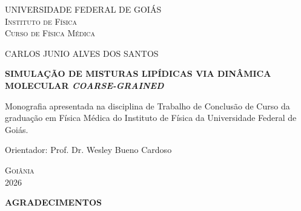 \newpage
\begin{center}
{\fontsize{12}{13.8}\selectfont
UNIVERSIDADE FEDERAL DE GOIÁS \\
\textsc{Instituto de Física} \\
\textsc{Curso de Física Médica}\par}

\vspace*{9\baselineskip}

{\fontsize{12}{13.8}\selectfont CARLOS JUNIO ALVES DOS SANTOS\par}

\vspace*{4\baselineskip}

{\fontsize{16}{18.4}\selectfont \textbf{SIMULAÇÃO DE MISTURAS LIPÍDICAS VIA DINÂMICA MOLECULAR \textit{COARSE-GRAINED}}\par}

\vspace*{\baselineskip}

\vspace*{1cm}
\noindent\hspace*{7cm}
\begin{minipage}{\dimexpr\textwidth-7cm\relax}
\fontsize{12}{13.8}\selectfont
Monografia apresentada na disciplina de Trabalho de Conclusão de Curso da graduação em Física Médica do Instituto de Física da Universidade Federal de Goiás.

\vspace{\baselineskip}
Orientador: Prof. Dr. Wesley Bueno Cardoso
\end{minipage}

\vspace*{\fill}

{\fontsize{12}{13.8}\selectfont \textsc{Goiânia} \\ 2026\par}
\end{center}



\newpage

 

\newpage
\begin{center}
{\fontsize{17}{20.4}\selectfont \textbf{AGRADECIMENTOS}}
\end{center}
\vspace*{1cm}

